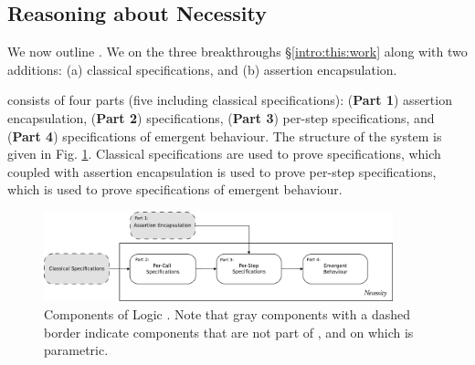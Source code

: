 \subsection{Reasoning about Necessity}
\label{s:approach}


We now outline .
We  on the three breakthroughs   %
\S\ref{intro:this:work}
along with two additions: (a) classical specifications, and (b) assertion encapsulation. 

 consists of four parts (five including classical specifications):
(\textbf{Part 1}) assertion encapsulation, (\textbf{Part 2})  specifications, 
(\textbf{Part 3}) per-step specifications, and (\textbf{Part 4}) specifications of emergent behaviour.
The structure of the system is given in Fig. \ref{fig:dependency}.
 Classical specifications are used to prove  specifications, which coupled with 
assertion encapsulation is used to prove per-step specifications, which is used to 
prove specifications of emergent behaviour.
\begin{figure}[t]
\includegraphics[width=0.9\textwidth]{diagrams/dependency.png}
   \caption{
   Components of \Nec Logic . 
   Note that gray components with a dashed border indicate
   components that are not part of \Nec, and on which \Nec 
   is parametric.
    }
   \label{fig:dependency}
 \end{figure}

